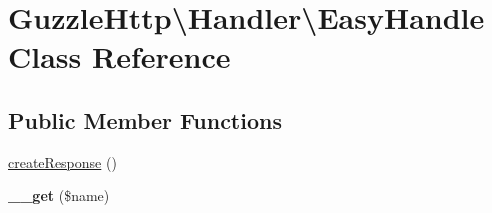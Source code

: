 \hypertarget{classGuzzleHttp_1_1Handler_1_1EasyHandle}{}\section{Guzzle\+Http\textbackslash{}Handler\textbackslash{}Easy\+Handle Class Reference}
\label{classGuzzleHttp_1_1Handler_1_1EasyHandle}
\subsection*{Public Member Functions}
\begin{DoxyCompactItemize}
\item 
\hyperlink{classGuzzleHttp_1_1Handler_1_1EasyHandle_a394f20adee55837ccc05e479af9dfaea}{create\+Response} ()
\item 
\mbox{\label{classGuzzleHttp_1_1Handler_1_1EasyHandle_ad7d7cd4d5818552d6d84d8e57c6423da}} 
{\bfseries \+\_\+\+\_\+get} (\$name)
\end{DoxyCompactItemize}
